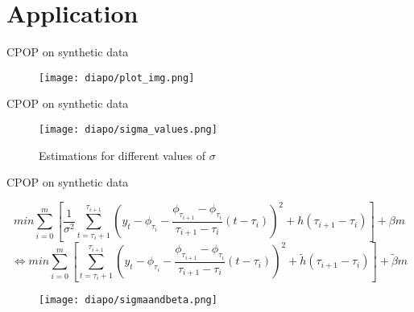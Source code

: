 \documentclass[10pt, xcolor=dvipsnames]{beamer}
\begin{document}
\section{Application}
\begin{frame}{CPOP on synthetic data}



\begin{figure}
    \centering
    \texttt{[image: diapo/plot\_img.png]}

    \label{fig:enter-label}
\end{figure}
    
\end{frame}

\begin{frame}{CPOP on synthetic data}




    \begin{figure}
        \centering
        \texttt{[image: diapo/sigma\_values.png]}
        \caption{Estimations for different values of $\sigma$}
        \label{fig:enter-label}
    \end{figure}
\end{frame}

\begin{frame}{CPOP on synthetic data}


    \[min \sum_{i=0}^m \left[\frac{1}{\sigma^2}\sum_{t=\tau_i+1}^{\tau_{i+1}} \left(y_t-\phi_{\tau_i}-\frac{\phi_{\tau_{i+1}}-\phi_{\tau_i}}{\tau_{i+1}-\tau_i}(t-\tau_i)\right)^2 + h(\tau_{i+1}-\tau_i)\right]+\beta m\]
\[\Leftrightarrow min \sum_{i=0}^m \left[\sum_{t=\tau_i+1}^{\tau_{i+1}} \left(y_t-\phi_{\tau_i}-\frac{\phi_{\tau_{i+1}}-\phi_{\tau_i}}{\tau_{i+1}-\tau_i}(t-\tau_i)\right)^2 + \tilde{h}(\tau_{i+1}-\tau_i)\right]+\tilde{\beta} m\]

\begin{figure}
    \centering
    \texttt{[image: diapo/sigmaandbeta.png]}

    \label{fig:enter-label}
\end{figure}
    
\end{frame}
\end{document}
